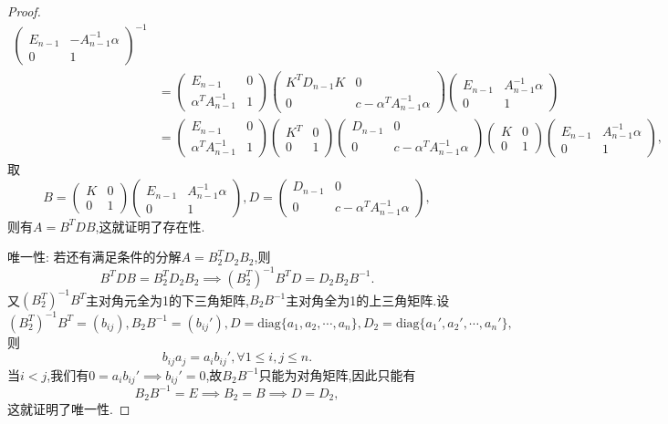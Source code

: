 \documentclass[../../main.tex]{subfiles}%
\begin{document}
\begin{proof}
\[\begin{aligned}
\begin{pmatrix}
E_{n - 1} & -A_{n - 1}^{-1} \alpha \\
0 & 1
\end{pmatrix}^{-1} \\
&= \begin{pmatrix}
E_{n - 1} & 0 \\
\alpha^T A_{n - 1}^{-1} & 1
\end{pmatrix} \begin{pmatrix}
K^T D_{n - 1} K & 0 \\
0 & c - \alpha^T A_{n - 1}^{-1} \alpha
\end{pmatrix} \begin{pmatrix}
E_{n - 1} & A_{n - 1}^{-1} \alpha \\
0 & 1
\end{pmatrix} \\
&= \begin{pmatrix}
E_{n - 1} & 0 \\
\alpha^T A_{n - 1}^{-1} & 1
\end{pmatrix} \begin{pmatrix}
K^T & 0 \\
0 & 1
\end{pmatrix} \begin{pmatrix}
D_{n - 1} & 0 \\
0 & c - \alpha^T A_{n - 1}^{-1} \alpha
\end{pmatrix} \begin{pmatrix}
K & 0 \\
0 & 1
\end{pmatrix} \begin{pmatrix}
E_{n - 1} & A_{n - 1}^{-1} \alpha \\
0 & 1
\end{pmatrix},
\end{aligned}
\]
取
\[
B = \begin{pmatrix}
K & 0 \\
0 & 1
\end{pmatrix} \begin{pmatrix}
E_{n - 1} & A_{n - 1}^{-1} \alpha \\
0 & 1
\end{pmatrix}, D = \begin{pmatrix}
D_{n - 1} & 0 \\
0 & c - \alpha^T A_{n - 1}^{-1} \alpha
\end{pmatrix},
\]
则有\( A = B^T D B \),这就证明了存在性.

{\heiti 唯一性:} 若还有满足条件的分解\( A = B_2^T D_2 B_2 \),则
\[
B^T D B = B_2^T D_2 B_2 \implies (B_2^T)^{-1} B^T D = D_2 B_2 B^{-1}.
\]
又\( (B_2^T)^{-1} B^T \)主对角元全为1的下三角矩阵,\( B_2 B^{-1} \)主对角全为1的上三角矩阵.设
\[
(B_2^T)^{-1} B^T = (b_{ij}), B_2 B^{-1} = (b_{ij}'), D = \text{diag}\{a_1, a_2, \cdots, a_n\}, D_2 = \text{diag}\{a_1', a_2', \cdots, a_n'\},
\]
则
\[
b_{ij} a_j = a_i b_{ij}', \forall 1 \leqslant  i, j \leqslant  n.
\]
当\( i < j \),我们有\( 0 = a_i b_{ij}' \implies b_{ij}' = 0 \),故\( B_2 B^{-1} \)只能为对角矩阵,因此只能有
\[
B_2 B^{-1} = E \implies B_2 = B \implies D = D_2,
\]
这就证明了唯一性.
\end{proof}
\end{document}
